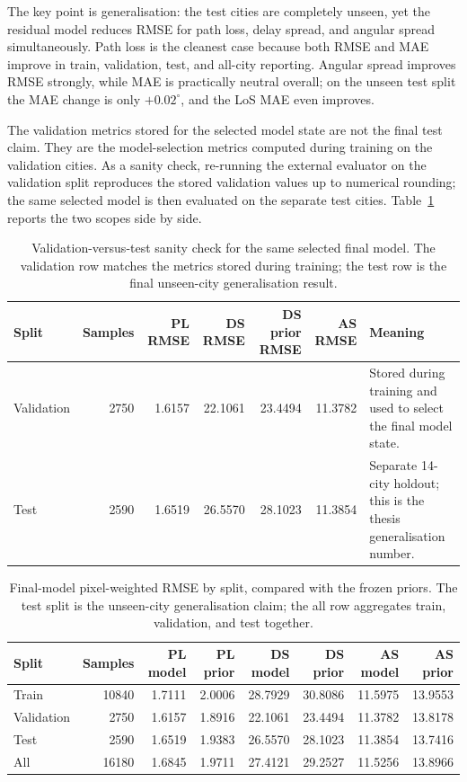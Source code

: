 The key point is generalisation: the test cities are completely unseen, yet
the residual model reduces RMSE for path loss, delay spread, and angular spread
simultaneously. Path loss is the cleanest case because both RMSE and MAE improve
in train, validation, test, and all-city reporting. Angular spread improves
RMSE strongly, while MAE is practically neutral overall; on the unseen test
split the MAE change is only \(+0.02^\circ\), and the LoS MAE even improves.

The validation metrics stored for the selected model state are not the final
test claim. They are the model-selection metrics computed during training on
the validation cities. As a sanity check, re-running the external evaluator on
the validation split reproduces the stored validation values up to numerical
rounding; the same selected model is then evaluated on the separate test
cities.
Table~\ref{tab:try80_val_test_sanity} reports the two scopes side by side.

\begin{table}[H]
\centering
\caption[Validation-versus-test sanity check.]%
{Validation-versus-test sanity check for the same selected final model. The
validation row matches the metrics stored during training; the test row is the
final unseen-city generalisation result.}
\label{tab:try80_val_test_sanity}
\scriptsize
\begin{tabularx}{\textwidth}{lrrrrr>{\raggedright\arraybackslash}X}
\toprule
Split & Samples & PL RMSE & DS RMSE & DS prior RMSE & AS RMSE & Meaning \\
\midrule
Validation & 2750 & 1.6157 & 22.1061 & 23.4494 & 11.3782 & Stored during training and used to select the final model state. \\
Test & 2590 & 1.6519 & 26.5570 & 28.1023 & 11.3854 & Separate 14-city holdout; this is the thesis generalisation number. \\
\bottomrule
\end{tabularx}
\end{table}

\begin{table}[H]
\centering
\caption[Final-model RMSE by split.]%
{Final-model pixel-weighted RMSE by split, compared with the frozen
priors. The test split is the unseen-city generalisation claim;
the all row aggregates train, validation, and test together.}
\label{tab:try80_split_absolute}
\scriptsize
\begin{tabular}{lrrrrrrr}
\toprule
Split & Samples & PL model & PL prior & DS model & DS prior & AS model & AS prior \\
\midrule
Train & 10840 & 1.7111 & 2.0006 & 28.7929 & 30.8086 & 11.5975 & 13.9553 \\
Validation & 2750 & 1.6157 & 1.8916 & 22.1061 & 23.4494 & 11.3782 & 13.8178 \\
Test & 2590 & 1.6519 & 1.9383 & 26.5570 & 28.1023 & 11.3854 & 13.7416 \\
All & 16180 & 1.6845 & 1.9711 & 27.4121 & 29.2527 & 11.5256 & 13.8966 \\
\bottomrule
\end{tabular}
\end{table}

